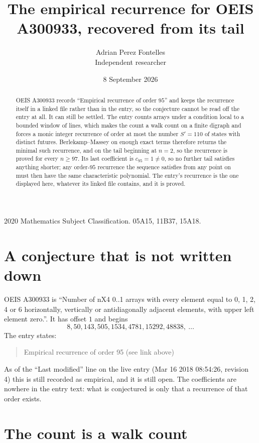 \documentclass[11pt,a4paper]{article}
\title{The empirical recurrence for OEIS A300933, recovered from its tail}
\author{Adrian Perez Fontelles\\ \small Independent researcher}
\date{8 September 2026}
\theoremstyle{plain}
\theoremstyle{definition}
\begin{document}
\maketitle

\begin{abstract}
OEIS A300933 records ``Empirical recurrence of order $95$'' and keeps the recurrence itself in
a linked file rather than in the entry, so the conjecture cannot be read off the entry at all.
It can still be settled. The entry counts arrays under a condition local to a bounded window of
lines, which makes the count a walk count on a finite digraph and forces a monic integer
recurrence of order at most the number $S'=110$ of states with distinct futures. Berlekamp--Massey on
enough exact terms therefore returns the minimal such recurrence, and on the tail beginning at $n=2$, so the recurrence is proved for every $n\ge97$.
Its last coefficient is $c_{95}=1\neq0$, so no further tail satisfies anything
shorter; any order-$95$ recurrence the sequence satisfies from any point on must then have
the same characteristic polynomial. The entry's recurrence is the one displayed here, whatever
its linked file contains, and it is proved.
\end{abstract}

\noindent\small 2020 Mathematics Subject Classification. 05A15, 11B37, 15A18.\normalsize

\section{A conjecture that is not written down}

OEIS A300933 is ``Number of nX4 0..1 arrays with every element equal to 0, 1, 2, 4 or 6 horizontally, vertically or antidiagonally adjacent elements, with upper left element zero.''. It has offset $1$ and begins
\[
8, 50, 143, 505, 1534, 4781, 15292, 48838,\ \dots
\]
The entry states:
\begin{quote}
Empirical recurrence of order 95 (see link above)
\end{quote}
As of the ``Last modified'' line on the live entry (Mar 16 2018 08:54:26, revision 4)
this is still recorded as empirical, and it is still open. The coefficients are nowhere in the
entry text: what is conjectured is only that a recurrence of that order exists.

\section{The count is a walk count}
\end{document}
